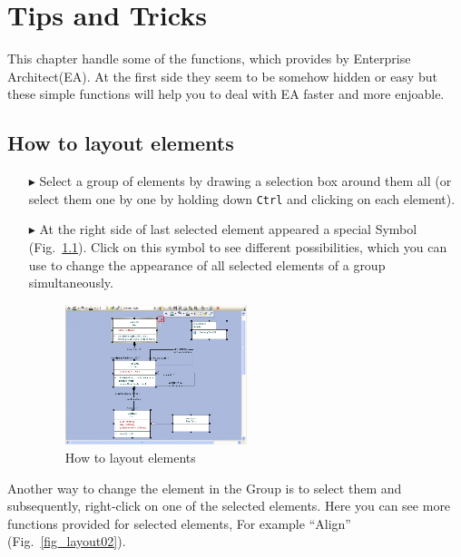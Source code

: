 \chapter{Tips and Tricks}
\label{chap:Tips and Tricks}

This chapter handle some of the functions, which provides by Enterprise Architect(EA).
At the first side they seem to be somehow hidden or easy but these simple functions will help you to deal with EA faster and more enjoable.

\section{How to layout elements}

\begin{enumerate}
\item[$\blacktriangleright$]Select a group of elements by drawing a selection box around them all (or select them one by one by holding down \texttt{Ctrl} and clicking on each element).

\item[$\blacktriangleright$]At the right side of last selected element appeared a special Symbol (Fig.~\ref{fig_layout01}).
Click on this symbol to see different possibilities, which you can use to change the appearance of all selected elements of a group simultaneously.
 
 \begin{figure}[htbp]
\begin{center}
  \includegraphics[width=0.5\textwidth]{pics/tricks/layoutElements/layoutElements1}
  \caption{How to layout elements}  
  \label{fig_layout01}
\end{center}
\end{figure}
 
\end{enumerate}


Another way to change the element in the Group is to select them and subsequently, right-click on one of the selected elements.  
Here you can see more functions provided for selected elements, For example ``Align'' (Fig.~\ref{fig_layout02}).
 
